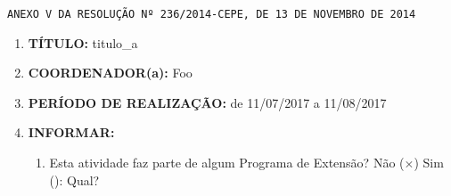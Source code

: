 \documentclass[12pt,a4paper,oneside]{article}%
\begin{document}
\fancyfoot[L]{
    \thepage
}
\fancyfoot[C]{}
\texttt{ANEXO V DA RESOLUÇÃO Nº 236/2014-CEPE, DE 13 DE NOVEMBRO DE 2014}%
\begin{flushright}%

\end{flushright}%
\hrulefill%
\begin{enumerate}%
\item%
\textbf{TÍTULO: }%
titulo\_a%
\item%
\textbf{COORDENADOR(a): }%
Foo%
\item%
\textbf{PERÍODO DE REALIZAÇÃO: }%
de 11/07/2017 a 11/08/2017%
\item%
\textbf{INFORMAR: }%
\begin{mdframed}[innertopmargin=5pt, innerleftmargin=3pt, innerrightmargin=3pt]%
\begin{enumerate}%
\scriptsize%
\item%
Esta atividade faz parte de algum Programa de Extensão? %
Não ($\times$) Sim (): Qual? %


\end{enumerate}
\end{mdframed}
\end{enumerate}
\end{document}
